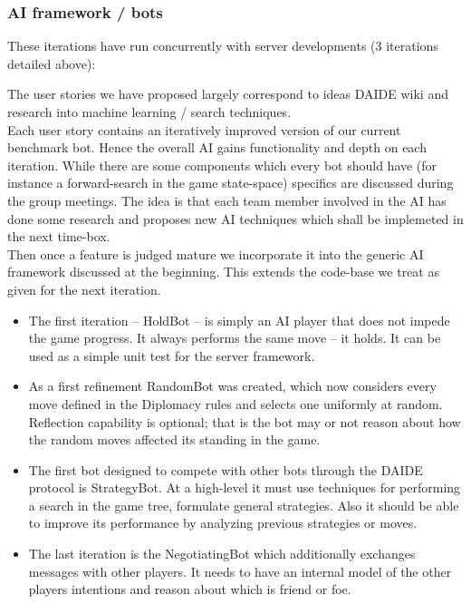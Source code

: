 \documentclass[pdftex,12pt,a4paper]{report}
\begin{document}
\subsubsection{AI framework / bots}

These iterations have run concurrently with server developments (3
iterations detailed above):

The user stories we have proposed largely correspond to ideas DAIDE
wiki and research into machine learning / search techniques.  \\ Each
user story contains an iteratively improved version of our current
benchmark bot. Hence the overall AI gains functionality and depth on
each iteration. While there are some components which every bot should
have (for instance a forward-search in the game state-space) specifics
are discussed during the group meetings. The idea is that each team
member involved in the AI has done some research and proposes new AI
techniques which shall be implemeted in the next time-box.  \\ Then
once a feature is judged mature we incorporate it into the generic AI
framework discussed at the beginning. This extends the code-base we
treat as given for the next iteration.

\begin{itemize}
\item The first iteration -- HoldBot -- is simply an AI player that
  does not impede the game progress. It always performs the same move
  -- it holds.  It can be used as a simple unit test for the server
  framework.
\item As a first refinement RandomBot was created, which now
  considers every move defined in the Diplomacy rules and selects one
  uniformly at random.  Reflection capability is optional; that is the
  bot may or not reason about how the random moves affected its
  standing in the game.
\item The first bot designed to compete with other bots through the
  DAIDE protocol is StrategyBot. At a high-level it must use
  techniques for performing a search in the game tree, formulate
  general strategies. Also it should be able to improve its
  performance by analyzing previous strategies or moves.
\item The last iteration is the NegotiatingBot which additionally
  exchanges messages with other players. It needs to have an internal
  model of the other players intentions and reason about which is
  friend or foe.
\end{itemize}
\end{document}

